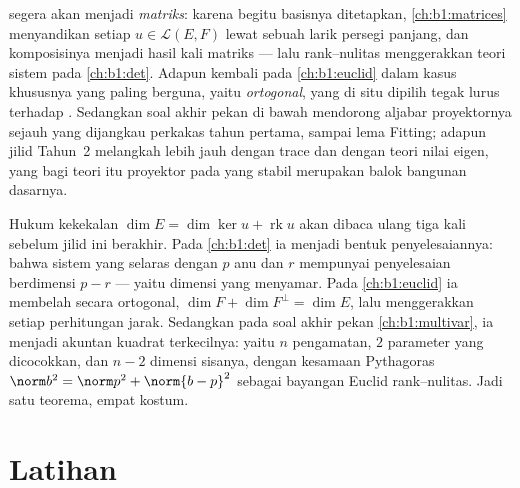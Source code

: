 \begin{remark}
\label{rem:b1:linmaps:whereused}
 segera akan menjadi \emph{matriks}: karena begitu basisnya
ditetapkan, \cref{ch:b1:matrices} menyandikan setiap $u \in \mathcal{L}(E,
F)$ lewat sebuah larik persegi panjang, dan komposisinya menjadi hasil kali
matriks --- lalu rank--nulitas menggerakkan teori sistem
 pada \cref{ch:b1:det}. Adapun  kembali pada
\cref{ch:b1:euclid} dalam kasus khususnya yang paling berguna, yaitu
 \emph{ortogonal}, yang di situ  dipilih
tegak lurus terhadap . Sedangkan soal akhir pekan di bawah mendorong
aljabar proyektornya sejauh yang dijangkau perkakas tahun pertama, sampai
lema Fitting; adapun jilid Tahun~2 melangkah lebih jauh dengan trace
dan dengan teori nilai eigen, yang bagi teori itu proyektor pada 
yang stabil merupakan balok bangunan dasarnya.
\end{remark}

\begin{remark}
\label{rem:b1:linmaps:perspectives}
Hukum kekekalan $\dim E = \dim\ker u + \operatorname{rk} u$
akan dibaca ulang tiga kali sebelum jilid ini berakhir. Pada
\cref{ch:b1:det} ia menjadi bentuk  penyelesaiannya: bahwa
sistem yang selaras dengan $p$ anu dan  $r$ mempunyai 
penyelesaian berdimensi $p - r$ --- yaitu dimensi  yang menyamar. Pada
\cref{ch:b1:euclid} ia membelah secara ortogonal, $\dim F + \dim
F^\perp = \dim E$, lalu menggerakkan setiap perhitungan jarak. Sedangkan pada
soal akhir pekan \cref{ch:b1:multivar}, ia menjadi
akuntan kuadrat terkecilnya: yaitu $n$ pengamatan, $2$ parameter yang
dicocokkan, dan $n - 2$ dimensi sisanya, dengan kesamaan Pythagoras
$\norm b^2 = \norm p^2 + \norm{b - p}^2$ sebagai
bayangan Euclid rank--nulitas. Jadi satu teorema, empat kostum.
\end{remark}

\section{Latihan}

